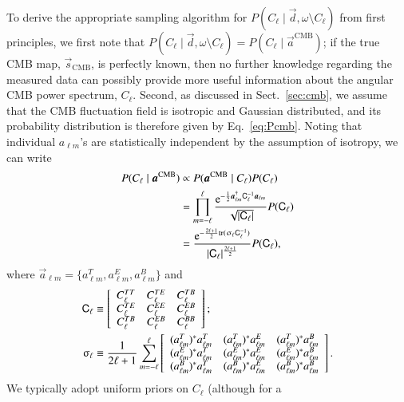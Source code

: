 \documentclass[twocolumn]{aa}
\renewcommand{\d}[0]{\vec{d}}
\newcommand{\s}[0]{\vec{s}}
\renewcommand{\a}[0]{\vec{a}}
\renewcommand{\C}[0]{\tens{C}}
\newcommand{\e}{\mathrm e}
\begin{document}
To derive the appropriate sampling algorithm for ${P(C_{\ell}\mid \d,
  \omega\setminus C_{\ell})}$ from first principles, we first note
that $P(C_{\ell}\mid \d, \omega\setminus C_{\ell}) = P(C_{\ell}\mid
\a^{\mathrm{CMB}})$; if the true CMB map, $\s_{\mathrm{CMB}}$, is
perfectly known, then no further knowledge regarding the measured data
can possibly provide more useful information about the angular CMB power
spectrum, $C_{\ell}$. Second, as discussed in
Sect.~\ref{sec:cmb}, we assume that the CMB fluctuation field is
isotropic and Gaussian distributed, and its probability distribution
is therefore given by Eq.~\eqref{eq:Pcmb}. Noting that individual
$a_{\ell m}$'s are statistically independent by the assumption of
isotropy, we can write \citep{wandelt2004}
\begin{align}
  P(C_{\ell}\mid \a^{\mathrm{CMB}}) &\propto
  P(\a^{\mathrm{CMB}}\mid C_{\ell})P(C_{\ell}) \\
  &= \prod_{m=-{\ell}}^{\ell} \frac{\e^{-\frac{1}{2}\a_{\ell
        m}^{\dagger} \C_{\ell}^{-1} \a_{\ell m}}}{\sqrt{|\C_{\ell}|}}
  P(\C_{\ell})\\
  &=
  \frac{\e^{-\frac{2\ell+1}{2}\mathrm{tr}(\upsigma_{\ell}\C_{\ell}^{-1})}}{|\C_{\ell}|^{\frac{2\ell+1}{2}}}
  P(\C_{\ell}),
  \label{eq:invwishart}
\end{align}
where $\a_{\ell m} = \{a_{\ell m}^{T}, a_{\ell m}^{E}, a_{\ell
  m}^{B}\}$ and
\begin{align}
  \C_{\ell}
&\equiv
  \left[
    \begin{array}{ccc}
      C_{\ell}^{TT} & C_{\ell}^{TE} & C_{\ell}^{TB} \\
      C_{\ell}^{TE} & C_{\ell}^{EE} & C_{\ell}^{EB} \\
      C_{\ell}^{TB} & C_{\ell}^{EB} & C_{\ell}^{BB} 
    \end{array}
    \right];\\
  \upsigma_{\ell}
&\equiv \frac{1}{2\ell+1}\sum_{m=-\ell}^{\ell}
  \left[
    \begin{array}{ccc}
      (a^T_{\ell m})^* a^T_{\ell m} & (a^T_{\ell m})^* a^E_{\ell m} &
      (a^T_{\ell m})^* a^B_{\ell m} \\
      (a^E_{\ell m})^* a^T_{\ell m} & (a^E_{\ell m})^* a^E_{\ell m} &
      (a^E_{\ell m})^* a^B_{\ell m} \\
      (a^B_{\ell m})^* a^T_{\ell m} & (a^B_{\ell m})^* a^E_{\ell m} &
      (a^B_{\ell m})^* a^B_{\ell m}
    \end{array}
    \right].
\end{align}
We typically adopt uniform priors on $C_{\ell}$ (although for a
\end{document}
